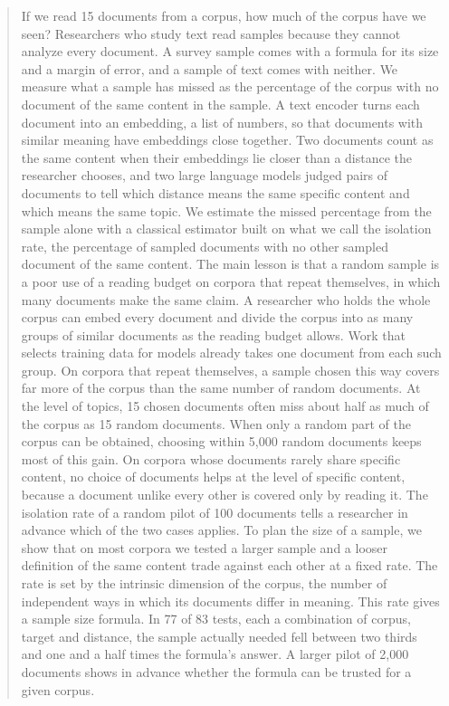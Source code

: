 \begin{abstract}
If we read 15 documents from a corpus, how much of the corpus have we seen? Researchers who study text read samples because they cannot analyze every document. A survey sample comes with a formula for its size and a margin of error, and a sample of text comes with neither. We measure what a sample has missed as the percentage of the corpus with no document of the same content in the sample. A text encoder turns each document into an embedding, a list of numbers, so that documents with similar meaning have embeddings close together. Two documents count as the same content when their embeddings lie closer than a distance the researcher chooses, and two large language models judged pairs of documents to tell which distance means the same specific content and which means the same topic. We estimate the missed percentage from the sample alone with a classical estimator built on what we call the isolation rate, the percentage of sampled documents with no other sampled document of the same content. The main lesson is that a random sample is a poor use of a reading budget on corpora that repeat themselves, in which many documents make the same claim. A researcher who holds the whole corpus can embed every document and divide the corpus into as many groups of similar documents as the reading budget allows. Work that selects training data for models already takes one document from each such group. On corpora that repeat themselves, a sample chosen this way covers far more of the corpus than the same number of random documents. At the level of topics, 15 chosen documents often miss about half as much of the corpus as 15 random documents. When only a random part of the corpus can be obtained, choosing within 5{,}000 random documents keeps most of this gain. On corpora whose documents rarely share specific content, no choice of documents helps at the level of specific content, because a document unlike every other is covered only by reading it. The isolation rate of a random pilot of 100 documents tells a researcher in advance which of the two cases applies. To plan the size of a sample, we show that on most corpora we tested a larger sample and a looser definition of the same content trade against each other at a fixed rate. The rate is set by the intrinsic dimension of the corpus, the number of independent ways in which its documents differ in meaning. This rate gives a sample size formula. In 77 of 83 tests, each a combination of corpus, target and distance, the sample actually needed fell between two thirds and one and a half times the formula's answer. A larger pilot of 2{,}000 documents shows in advance whether the formula can be trusted for a given corpus.
\end{abstract}
